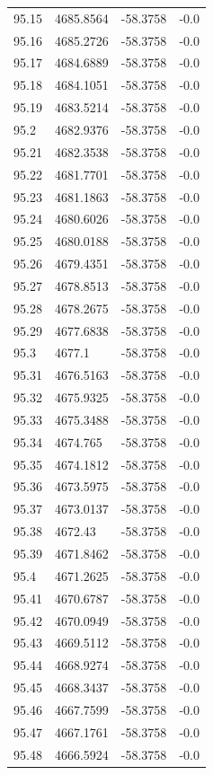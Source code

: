 \begin{table}[H]
\begin{tabular}{llll}
95.15 & 4685.8564 & -58.3758 & -0.0 \\
95.16 & 4685.2726 & -58.3758 & -0.0 \\
95.17 & 4684.6889 & -58.3758 & -0.0 \\
95.18 & 4684.1051 & -58.3758 & -0.0 \\
95.19 & 4683.5214 & -58.3758 & -0.0 \\
95.2 & 4682.9376 & -58.3758 & -0.0 \\
95.21 & 4682.3538 & -58.3758 & -0.0 \\
95.22 & 4681.7701 & -58.3758 & -0.0 \\
95.23 & 4681.1863 & -58.3758 & -0.0 \\
95.24 & 4680.6026 & -58.3758 & -0.0 \\
95.25 & 4680.0188 & -58.3758 & -0.0 \\
95.26 & 4679.4351 & -58.3758 & -0.0 \\
95.27 & 4678.8513 & -58.3758 & -0.0 \\
95.28 & 4678.2675 & -58.3758 & -0.0 \\
95.29 & 4677.6838 & -58.3758 & -0.0 \\
95.3 & 4677.1 & -58.3758 & -0.0 \\
95.31 & 4676.5163 & -58.3758 & -0.0 \\
95.32 & 4675.9325 & -58.3758 & -0.0 \\
95.33 & 4675.3488 & -58.3758 & -0.0 \\
95.34 & 4674.765 & -58.3758 & -0.0 \\
95.35 & 4674.1812 & -58.3758 & -0.0 \\
95.36 & 4673.5975 & -58.3758 & -0.0 \\
95.37 & 4673.0137 & -58.3758 & -0.0 \\
95.38 & 4672.43 & -58.3758 & -0.0 \\
95.39 & 4671.8462 & -58.3758 & -0.0 \\
95.4 & 4671.2625 & -58.3758 & -0.0 \\
95.41 & 4670.6787 & -58.3758 & -0.0 \\
95.42 & 4670.0949 & -58.3758 & -0.0 \\
95.43 & 4669.5112 & -58.3758 & -0.0 \\
95.44 & 4668.9274 & -58.3758 & -0.0 \\
95.45 & 4668.3437 & -58.3758 & -0.0 \\
95.46 & 4667.7599 & -58.3758 & -0.0 \\
95.47 & 4667.1761 & -58.3758 & -0.0 \\
95.48 & 4666.5924 & -58.3758 & -0.0 \\

\end{tabular}
\end{table}
